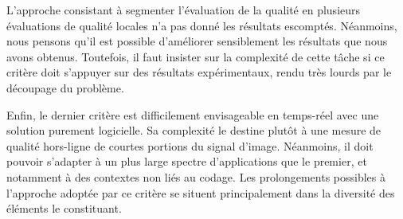 L'approche consistant à segmenter l'évaluation de la qualité en plusieurs évaluations de qualité locales n'a pas donné les résultats escomptés. Néanmoins, nous pensons qu'il est possible d'améliorer sensiblement les résultats que nous avons obtenus. Toutefois, il faut insister sur la complexité de cette tâche si ce critère doit s'appuyer sur des résultats expérimentaux, rendu très lourds par le découpage du problème.

Enfin, le dernier critère est difficilement envisageable en temps-réel avec une solution purement logicielle. Sa complexité le destine plutôt à une mesure de qualité hors-ligne de courtes portions du signal d'image. Néanmoins, il doit pouvoir s'adapter à un plus large spectre d'applications que le premier, et notamment à des contextes non liés au codage. Les prolongements possibles à l'approche adoptée par ce critère se situent principalement dans la diversité des éléments le constituant.

\ornementChapitre
